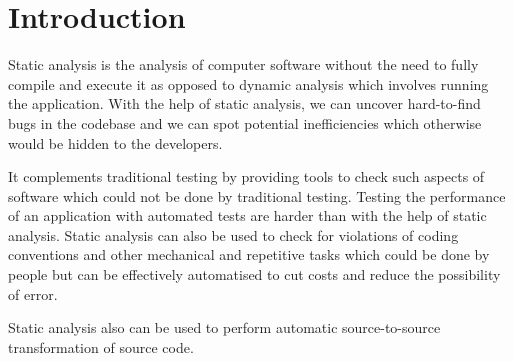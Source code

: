 \section{Introduction}
Static analysis is the analysis of computer software without the need to fully compile and execute it as opposed to dynamic analysis\cite{dynamic_analysis} which involves running the application. With the help of static analysis, we can uncover hard-to-find bugs in the codebase and we can spot potential inefficiencies which otherwise would be hidden to the developers. \medskip 
\par It complements traditional testing by providing tools to check such aspects of software which could not be done by traditional testing. Testing the performance of an application with automated tests are harder than with the help of static analysis. Static analysis can also be used to check for violations of coding conventions and other mechanical and repetitive tasks which could be done by people but can be effectively automatised to cut costs and reduce the possibility of error. \medskip 
\par Static analysis also can be used to perform automatic source-to-source transformation of source code.